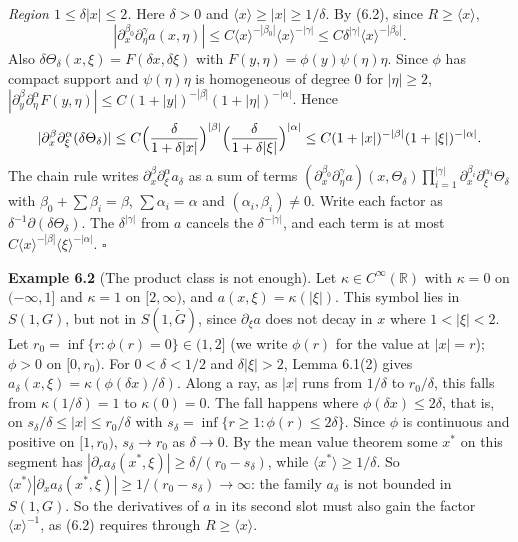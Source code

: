 \documentclass[
  11pt,
]{article}
\begin{document}
\emph{Region \(1\le\delta|x|\le2\).} Here \(\delta>0\) and
\(\langle x\rangle\ge|x|\ge1/\delta\). By (6.2), since
\(R\ge\langle x\rangle\), \[
|\partial_x^{\beta_0}\partial_\eta^\gamma a(x,\eta)|\le C\langle x\rangle^{-|\beta_0|}\langle x\rangle^{-|\gamma|}\le C\delta^{|\gamma|}\langle x\rangle^{-|\beta_0|}.
\] Also \(\delta\Theta_\delta(x,\xi)=F(\delta x,\delta\xi)\) with
\(F(y,\eta)=\phi(y)\psi(\eta)\eta\). Since \(\phi\) has compact support
and \(\psi(\eta)\eta\) is homogeneous of degree \(0\) for
\(|\eta|\ge2\),
\(|\partial_y^\beta\partial_\eta^\alpha F(y,\eta)|\le C(1+|y|)^{-|\beta|}(1+|\eta|)^{-|\alpha|}\).
Hence \[
|\partial_x^\beta\partial_\xi^\alpha(\delta\Theta_\delta)|\le C\Bigl(\frac{\delta}{1+\delta|x|}\Bigr)^{|\beta|}\Bigl(\frac{\delta}{1+\delta|\xi|}\Bigr)^{|\alpha|}\le C(1+|x|)^{-|\beta|}(1+|\xi|)^{-|\alpha|}.
\] The chain rule writes
\(\partial_x^\beta\partial_\xi^\alpha a_\delta\) as a sum of terms
\((\partial_x^{\beta_0}\partial_\eta^\gamma a)(x,\Theta_\delta)\prod_{i=1}^{|\gamma|}\partial_x^{\beta_i}\partial_\xi^{\alpha_i}\Theta_\delta\)
with \(\beta_0+\sum\beta_i=\beta\), \(\sum\alpha_i=\alpha\) and
\((\alpha_i,\beta_i)\ne0\). Write each factor as
\(\delta^{-1}\partial(\delta\Theta_\delta)\). The \(\delta^{|\gamma|}\)
from \(a\) cancels the \(\delta^{-|\gamma|}\), and each term is at most
\(C\langle x\rangle^{-|\beta|}\langle\xi\rangle^{-|\alpha|}\).
\(\square\)

\textbf{Example 6.2} (The product class is not enough). Let
\(\kappa\in C^\infty(\mathbb R)\) with \(\kappa=0\) on \((-\infty,1]\)
and \(\kappa=1\) on \([2,\infty)\), and \(a(x,\xi)=\kappa(|\xi|)\). This
symbol lies in \(S(1,G)\), but not in \(S(1,\tilde G)\), since
\(\partial_\xi a\) does not decay in \(x\) where \(1<|\xi|<2\). Let
\(r_0=\inf\{r:\phi(r)=0\}\in(1,2]\) (we write \(\phi(r)\) for the value
at \(|x|=r\)); \(\phi>0\) on \([0,r_0)\). For \(0<\delta<1/2\) and
\(\delta|\xi|>2\), Lemma 6.1(2) gives
\(a_\delta(x,\xi)=\kappa(\phi(\delta x)/\delta)\). Along a ray, as
\(|x|\) runs from \(1/\delta\) to \(r_0/\delta\), this falls from
\(\kappa(1/\delta)=1\) to \(\kappa(0)=0\). The fall happens where
\(\phi(\delta x)\le2\delta\), that is, on
\(s_\delta/\delta\le|x|\le r_0/\delta\) with
\(s_\delta=\inf\{r\ge1:\phi(r)\le2\delta\}\). Since \(\phi\) is
continuous and positive on \([1,r_0)\), \(s_\delta\to r_0\) as
\(\delta\to0\). By the mean value theorem some \(x^*\) on this segment
has \(|\partial_ra_\delta(x^*,\xi)|\ge\delta/(r_0-s_\delta)\), while
\(\langle x^*\rangle\ge1/\delta\). So
\(\langle x^*\rangle|\partial_xa_\delta(x^*,\xi)|\ge1/(r_0-s_\delta)\to\infty\):
the family \(a_\delta\) is not bounded in \(S(1,G)\). So the derivatives
of \(a\) in its second slot must also gain the factor
\(\langle x\rangle^{-1}\), as (6.2) requires through
\(R\ge\langle x\rangle\).
\end{document}
